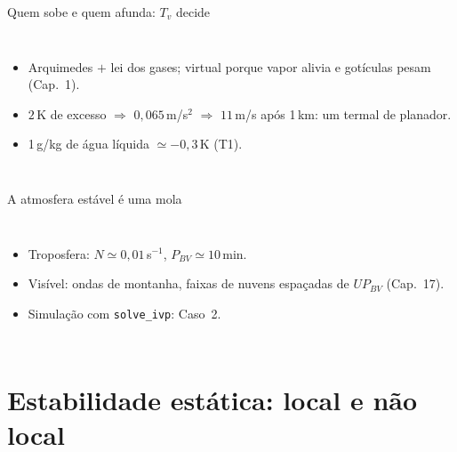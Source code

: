 \documentclass[aspectratio=169,11pt]{beamer}
\begin{document}
\begin{frame}{Quem sobe e quem afunda: $T_v$ decide}
  \begin{columns}
    \vspace{0.4em}
    \begin{itemize}
      \item Arquimedes $+$ lei dos gases; \alert{virtual} porque vapor
            alivia e gotículas pesam (Cap.~1).
      \item $2$\,K de excesso $\Rightarrow$ $0{,}065$\,m/s$^2$
            $\Rightarrow$ $11$\,m/s após 1\,km: um termal de planador.
      \item 1\,g/kg de água líquida $\simeq -0{,}3$\,K (T1).
    \end{itemize}
  \end{columns}
\end{frame}

\begin{frame}{A atmosfera estável é uma mola}
  \begin{columns}
    \vspace{0.4em}
    \begin{itemize}
      \item Troposfera: $N \simeq 0{,}01$\,s$^{-1}$,
            $P_{BV} \simeq 10$\,min.
      \item Visível: ondas de montanha, faixas de nuvens espaçadas de
            $U P_{BV}$ (Cap.~17).
      \item Simulação com \texttt{solve\_ivp}: Caso~2.
    \end{itemize}
  \end{columns}
\end{frame}

\section{Estabilidade estática: local e não local}
\end{document}

